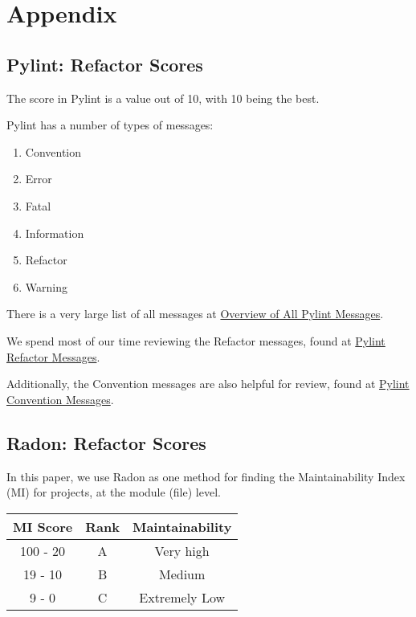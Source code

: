 \setcounter{chapter}{7}

\chapter*{Appendix} \label{chapterAppendix}

\section{Pylint: Refactor Scores} \label{appendixPylintRefactor}

The score in Pylint is a value out of 10, with 10 being the best.

Pylint has a number of types of messages:
\begin{singlespace}
  \begin{enumerate}
    \item Convention
    \item Error
    \item Fatal
    \item Information
    \item Refactor
    \item Warning
  \end{enumerate}
\end{singlespace}

There is a very large list of all messages at \href{https://pylint.pycqa.org/en/latest/messages/messages_list.html}{Overview of All Pylint Messages}.

We spend most of our time reviewing the Refactor messages, found at \href{https://pylint.pycqa.org/en/latest/messages/messages_list.html#refactor}{Pylint Refactor Messages}.

Additionally, the Convention messages are also helpful for review, found at \href{https://pylint.pycqa.org/en/latest/messages/messages_list.html#convention}{Pylint Convention Messages}.

\section{Radon: Refactor Scores} \label{appendixRadonRefactor}

In this paper, we use Radon as one method for finding the Maintainability Index (MI) for projects, at the module (file) level.

\begin{center}
  \begin{tabular}{ c c c }
    MI Score & Rank & Maintainability \\ \hline\hline
    100 - 20 & A & Very high \\ \hline
    19 - 10 & B & Medium \\ \hline
    9 - 0 & C & Extremely Low \\ \hline    
  \end{tabular}
\end{center}
